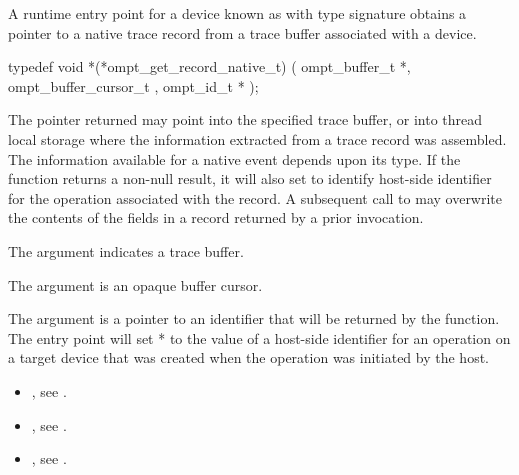 \label{sec:ompt_get_record_native_t}

\summary

A runtime entry point for a device known as
 with type signature
obtains a pointer to a native trace record from a trace buffer associated with a device.

\format
\begin{ccppspecific}
\begin{omptInquiry}
typedef void *(*ompt_get_record_native_t) (
  ompt_buffer_t *,
  ompt_buffer_cursor_t ,
  ompt_id_t *
);
\end{omptInquiry}
\end{ccppspecific}

\descr

The pointer returned  may point into the specified trace buffer, or into
thread local storage where the information extracted from a trace
record was assembled. The information available for a native event
depends upon its type. If the function returns a non-null result,
it will also set  to identify host-side identifier
for the operation associated with the record.  A subsequent call
to  may overwrite the
contents of the fields in a record returned by a prior invocation.

\argdesc
The argument  indicates a trace buffer.

The argument  is an opaque buffer cursor.

The argument  is a pointer to an identifier
that will be returned by the function. The entry point will set
* to the value of a host-side identifier for an operation on
a target device that was created when the operation was initiated by
the host.


\crossreferences
\begin{itemize}
\item {},
see .
\item {},
see .
\item {},
see .
\end{itemize}

\label{sec:ompt_get_record_abstract_t}


